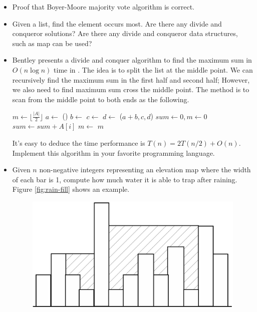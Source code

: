 \documentclass[UTF8]{article}
\begin{document}
\begin{Exercise}
\begin{itemize}
\item Proof that Boyer-Moore majority vote algorithm is correct.
\item Given a list, find the element occurs most. Are there any divide and conqueror solutions?
Are there any divide and conqueror data structures, such as map can be used?
\item Bentley presents a divide and conquer algorithm to find the maximum sum in $O(n \log n)$ time in \cite{programming-pearls}.
The idea is to split the list at the middle point. We can recursively find the maximum sum in the first half
and second half; However, we also need to find maximum sum cross the middle point. The method is to scan
from the middle point to both ends as the following.
\begin{algorithmic}[1]
    \State {}
    \State \Return {}
  \Else
    \State $m \gets \lfloor \frac{|A|}{2} \rfloor$
    \State $a \gets$ ()
    \State $b \gets$ 
    \State $c \gets$ 
    \State $d \gets$ \Call{Max-Sum}{$A[m+1...|A|$}
    \State \Return {}($a+b, c, d$)
  \EndIf
\EndFunction
\Statex
{}
  \State $sum \gets 0, m \gets 0$
    \State $sum \gets sum + A[i]$
    \State $m \gets $ 
  \EndFor
  \State \Return $m$
\EndFunction
\end{algorithmic}
It's easy to deduce the time performance is $T(n) = 2T(n/2) + O(n)$. Implement this algorithm in your
favorite programming language.
\item Given $n$ non-negative integers representing an elevation map where the width of each bar is 1,
compute how much water it is able to trap after raining. Figure \ref{fig:rain-fill} shows an example.
\begin{figure}[htbp]
 \centering
 \includegraphics[scale=0.3]{scan/rain-fill/img/rain-fill.eps}

\end{figure}
\end{itemize}
\end{Exercise}
\end{document}
